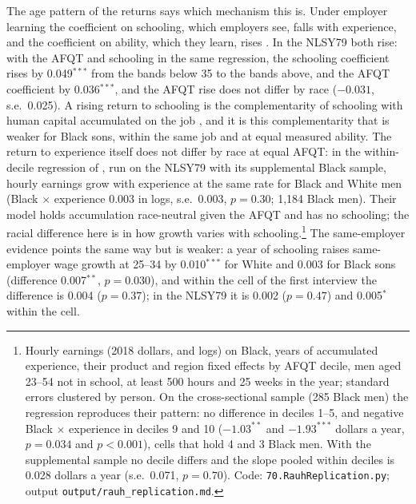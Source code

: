 The age pattern of the returns says which mechanism this is. Under employer learning the coefficient on schooling, which
employers see, falls with experience, and the coefficient on ability, which they learn, rises
\citep{altonji2001employer, lange2007speed, arcidiacono2010beyond}. In the NLSY79 both rise: with the AFQT and schooling
in the same regression, the schooling coefficient rises by 0.049$^{***}$ from the bands below 35 to the bands above, and
the AFQT coefficient by 0.036$^{***}$, and the AFQT rise does not differ by race ($-0.031$, s.e.\ 0.025). A rising return
to schooling is the complementarity of schooling with human capital accumulated on the job \citep{bhuller2017life},
and it is this complementarity that is weaker for Black sons, within the same job and at equal measured ability.
The return to experience itself does not differ by race at equal AFQT: in the within-decile regression of
\citet{rauh2023black}, run on the NLSY79 with its supplemental Black sample, hourly earnings grow with experience at the
same rate for Black and White men (Black $\times$ experience 0.003 in logs, s.e.\ 0.003, $p = 0.30$; 1,184 Black men).
Their model holds accumulation race-neutral given the AFQT and has no schooling; the racial difference here is in how
growth varies with schooling.\footnote{Hourly earnings (2018 dollars, and logs) on Black, years of accumulated
experience, their product and region fixed effects by AFQT decile, men aged 23--54 not in school, at least 500 hours and
25 weeks in the year; standard errors clustered by person. On the cross-sectional sample (285 Black men) the regression
reproduces their pattern: no difference in deciles 1--5, and negative Black $\times$ experience in deciles 9 and 10
($-1.03^{**}$ and $-1.93^{***}$ dollars a year, $p = 0.034$ and $p < 0.001$), cells that hold 4 and 3 Black men. With
the supplemental sample no decile differs and the slope pooled within deciles is 0.028 dollars a year (s.e.\ 0.071,
$p = 0.70$). Code: \texttt{70.RauhReplication.py}; output \texttt{output/rauh\_replication.md}.}
The same-employer evidence points the same way but is weaker: a year of schooling raises same-employer wage growth at
25--34 by 0.010$^{***}$ for White and 0.003 for Black sons (difference 0.007$^{**}$, $p=0.030$), and within the cell of
the first interview the difference is 0.004 ($p=0.37$); in the NLSY79 it is 0.002 ($p=0.47$) and 0.005$^{*}$ within the
cell.


